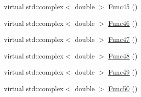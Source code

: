 \begin{DoxyCompactItemize}
\item 
virtual std\-::complex$<$ double $>$ \hyperlink{classosea_1_1ofreq_1_1_equationof_motion_af447cb3b12a7dd0667a2e1ebf95b9012}{Func45} ()
\item 
virtual std\-::complex$<$ double $>$ \hyperlink{classosea_1_1ofreq_1_1_equationof_motion_ae26b7d1ec3c7ac4d8e16188e46cc3350}{Func46} ()
\item 
virtual std\-::complex$<$ double $>$ \hyperlink{classosea_1_1ofreq_1_1_equationof_motion_a63049815de6897a3e981939434e2435c}{Func47} ()
\item 
virtual std\-::complex$<$ double $>$ \hyperlink{classosea_1_1ofreq_1_1_equationof_motion_ae6eb5b8e68ea3ea44cecc4a528e61d1c}{Func48} ()
\item 
virtual std\-::complex$<$ double $>$ \hyperlink{classosea_1_1ofreq_1_1_equationof_motion_af5fc7d0ef4f09f546779bbab205603e8}{Func49} ()
\item 
virtual std\-::complex$<$ double $>$ \hyperlink{classosea_1_1ofreq_1_1_equationof_motion_acb2bacacd96cf28600678e1a5a0ae397}{Func50} ()
\end{DoxyCompactItemize}
